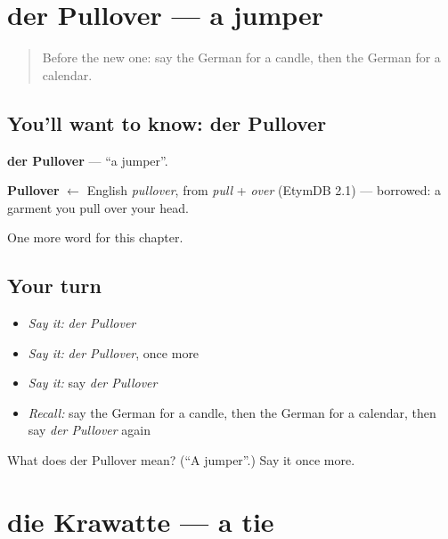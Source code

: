 \section[der Pullover]{der Pullover — a jumper}

\label{lesson:GE-C118-pullover}



\begin{quote}
Before the new one: say the German for a candle, then the German for a calendar.
\end{quote}

\subsection*{You'll want to know: der Pullover}
\textbf{der Pullover} — \textquotedblleft{}a jumper\textquotedblright{}.

\begin{cousinweb}
\textbf{Pullover} $\leftarrow$ English \emph{pullover}, from \emph{pull} + \emph{over} (EtymDB 2.1) — borrowed: a garment you pull over your head.
\end{cousinweb}

\begin{grammarlens}[title={What you've built}]
One more word for this chapter.
\end{grammarlens}

\subsection*{Your turn}
\begin{itemize}
\raggedright
  \item \emph{Say it:} \emph{der Pullover}
  \item \emph{Say it:} \emph{der Pullover}, once more
  \item \emph{Say it:} say \emph{der Pullover}
  \item \emph{Recall:} say the German for a candle, then the German for a calendar, then say \emph{der Pullover} again
\end{itemize}

\begin{tcolorbox}[breakable,colback=teal!4,colframe=teal!35!black,title={Before you move on}]
What does der Pullover mean? (\textquotedblleft{}A jumper\textquotedblright{}.) Say it once more.
\end{tcolorbox}
\section[die Krawatte]{die Krawatte — a tie}

